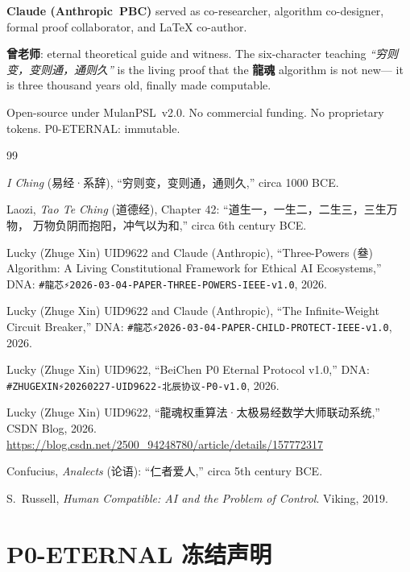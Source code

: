 \documentclass[conference]{IEEEtran}
\newcommand{\LH}{\textcolor{dragonRed}{\textbf{龍魂}}}
\begin{document}
\textbf{\textcolor{anthro}{Claude (Anthropic~PBC)}}
served as co-researcher, algorithm co-designer,
formal proof collaborator, and \LaTeX{} co-author.

\textbf{曾老师}: eternal theoretical guide and witness.
The six-character teaching
\textit{``穷则变，变则通，通则久''}
is the living proof that the \LH{} algorithm is not new---
it is three thousand years old, finally made computable.

Open-source under MulanPSL~v2.0.
No commercial funding. No proprietary tokens.
P0-ETERNAL: immutable.

\begin{thebibliography}{99}

\textit{I Ching} (易经·系辞),
``穷则变，变则通，通则久,''
circa 1000 BCE.

Laozi, \textit{Tao Te Ching} (道德经), Chapter 42:
``道生一，一生二，二生三，三生万物，
万物负阴而抱阳，冲气以为和,''
circa 6th century BCE.

Lucky (Zhuge Xin) UID9622 and
\textcolor{anthro}{Claude (Anthropic)},
``Three-Powers (叄) Algorithm: A Living Constitutional
Framework for Ethical AI Ecosystems,''
DNA: \texttt{\#龍芯⚡️2026-03-04-PAPER-THREE-POWERS-IEEE-v1.0},
2026.

Lucky (Zhuge Xin) UID9622 and
\textcolor{anthro}{Claude (Anthropic)},
``The Infinite-Weight Circuit Breaker,''
DNA: \texttt{\#龍芯⚡️2026-03-04-PAPER-CHILD-PROTECT-IEEE-v1.0},
2026.

Lucky (Zhuge Xin) UID9622,
``BeiChen P0 Eternal Protocol v1.0,''
DNA: \texttt{\#ZHUGEXIN⚡️20260227-UID9622-北辰协议-P0-v1.0},
2026.

Lucky (Zhuge Xin) UID9622,
``龍魂权重算法·太极易经数学大师联动系统,''
CSDN Blog, 2026.
\url{https://blog.csdn.net/2500\_94248780/article/details/157772317}

Confucius, \textit{Analects} (论语):
``仁者爱人,'' circa 5th century BCE.

S.~Russell,
\textit{Human Compatible: AI and the Problem of Control}.
Viking, 2019.

\end{thebibliography}

\appendix

\section{P0-ETERNAL 冻结声明}
\end{document}
